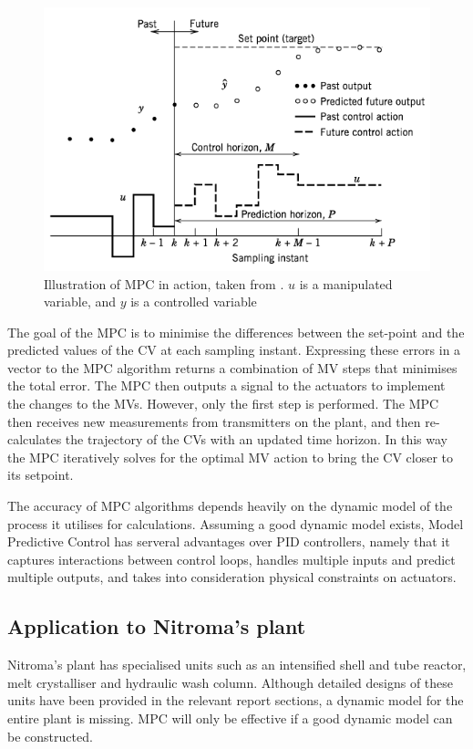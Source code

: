     \begin{figure}
        \centering
        \includegraphics[width=\linewidth]{chapters/4-operation-control/4-Figures/MPC-Seborg-2011.png}
        \caption{Illustration of MPC in action, taken from \textcite{}. $u$ is a manipulated variable, and $y$ is a controlled variable}
        \label{fig:MPC}
    \end{figure}

The goal of the MPC is to minimise the differences between the set-point and the predicted values of the CV at each sampling instant. Expressing these errors in a vector to the MPC algorithm returns a combination of MV steps that minimises the total error. The MPC then outputs a signal to the actuators to implement the changes to the MVs. However, only the first step is performed. The MPC then receives new measurements from transmitters on the plant, and then re-calculates the trajectory of the CVs with an updated time horizon. In this way the MPC iteratively solves for the optimal MV action to bring the CV closer to its setpoint. 

The accuracy of MPC algorithms depends heavily on the dynamic model of the process it utilises for calculations. Assuming a good dynamic model exists, Model Predictive Control has serveral advantages over PID controllers, namely that it captures interactions between control loops, handles multiple inputs and predict multiple outputs, and takes into consideration physical constraints on actuators. 

\subsection{Application to Nitroma's plant}
Nitroma's plant has specialised units such as an intensified shell and tube reactor, melt crystalliser and hydraulic wash column. Although detailed designs of these units have been provided in the relevant report sections, a dynamic model for the entire plant is missing. MPC will only be effective if a good dynamic model can be constructed. 

